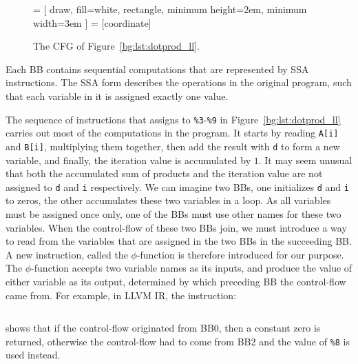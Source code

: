 \begin{figure}[ht]
    \centering
     = [
        draw, fill=white, rectangle, minimum height=2em, minimum width=3em
    ]
     = [coordinate]
    \caption{The CFG of Figure~\ref{bg:lst:dotprod_ll}.
    }\label{bg:fig:dotprod_cfg}
\end{figure}

Each BB contains sequential computations that are represented by SSA
instructions.  The SSA form describes the operations in the original
program, such that each variable in it is assigned exactly one value.

The sequence of instructions that assigns to \verb|%3|-\verb|%9| in
Figure~\ref{bg:lst:dotprod_ll} carries out most of the computations in the
program.  It starts by reading \verb|A[i]| and \verb|B[i]|, multiplying them
together, then add the result with \verb|d| to form a new variable, and
finally, the iteration value is accumulated by $1$.  It may seem unusual
that both the accumulated sum of products and the iteration value are not
assigned to \verb|d| and \verb|i| respectively.  We can imagine two BBs, one
initializes \verb|d| and \verb|i| to zeros, the other accumulates these two
variables in a loop.  As all variables must be assigned once only, one of the
BBs must use other names for these two variables.  When the control-flow of
these two BBs join, we must introduce a way to read from the variables that are
assigned in the two BBs in the succeeding BB\@.  A new instruction, called the
$\phi$-function is therefore introduced for our purpose.  The $\phi$-function
accepts two variable names as its inputs, and produce the value of either
variable as its output, determined by which preceding BB the control-flow came
from.  For example, in LLVM IR, the instruction:
\begin{lstlisting}[language=LLVM, basicstyle=\tt]
    %d.01 = phi float [ 0.000000e+00, %0 ], [ %8, %2 ]
\end{lstlisting}\vspace{-16.5pt}
shows that if the control-flow originated from BB0, then a constant zero is
returned, otherwise the control-flow had to come from BB2 and the value of
\verb|%8| is used instead.

